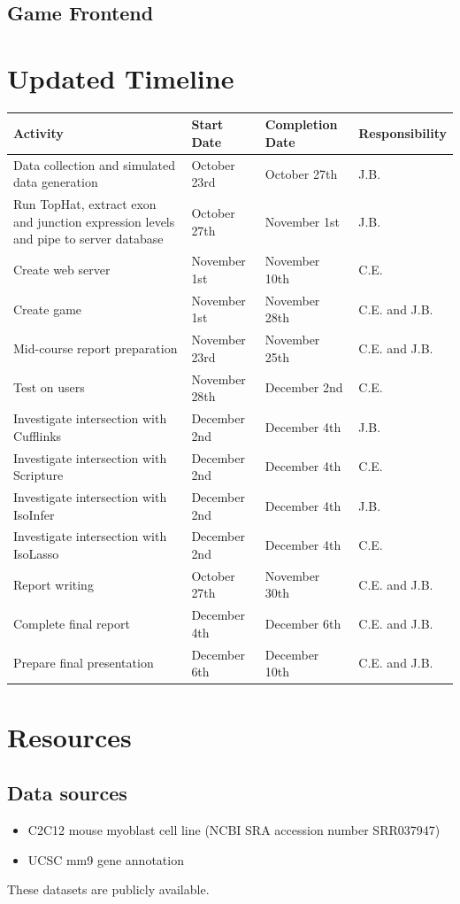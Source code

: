 \documentclass[12pt]{article}
\begin{document}
\subsection*{Game Frontend}

\section{Updated Timeline}
\begin{tabularx}{\linewidth}{X || l || l || X}
\textbf{Activity} & \textbf{Start Date} & \textbf{Completion Date} & \textbf{Responsibility} \\
\hline
Data collection and simulated data generation & October 23rd & October 27th & J.B. \\
\hline
Run TopHat, extract exon and junction expression levels and pipe to server database & October 27th & November 1st & J.B. \\
\hline
Create web server & November 1st & November 10th & C.E. \\
\hline
Create game & November 1st & November 28th & C.E. and J.B. \\
\hline
Mid-course report preparation & November 23rd & November 25th & C.E. and J.B. \\
\hline
Test on users & November 28th & December 2nd & C.E. \\
\hline
Investigate intersection with Cufflinks & December 2nd & December 4th & J.B. \\
\hline
Investigate intersection with Scripture & December 2nd & December 4th & C.E. \\
\hline
Investigate intersection with IsoInfer & December 2nd & December 4th & J.B. \\
\hline
Investigate intersection with IsoLasso & December 2nd & December 4th & C.E. \\
\hline
Report writing & October 27th & November 30th & C.E. and J.B. \\
\hline
Complete final report & December 4th & December 6th & C.E. and J.B. \\
\hline
Prepare final presentation & December 6th & December 10th & C.E. and J.B. \\
\end{tabularx}

\section*{Resources}
\subsection*{Data sources}
\begin{itemize}
\item C2C12 mouse myoblast cell line (NCBI SRA accession number SRR037947) \citep{trapnell2010transcript}
\item UCSC mm9 gene annotation \citep{karolchik2008ucsc}
\end{itemize}
These datasets are publicly available.
\end{document}
